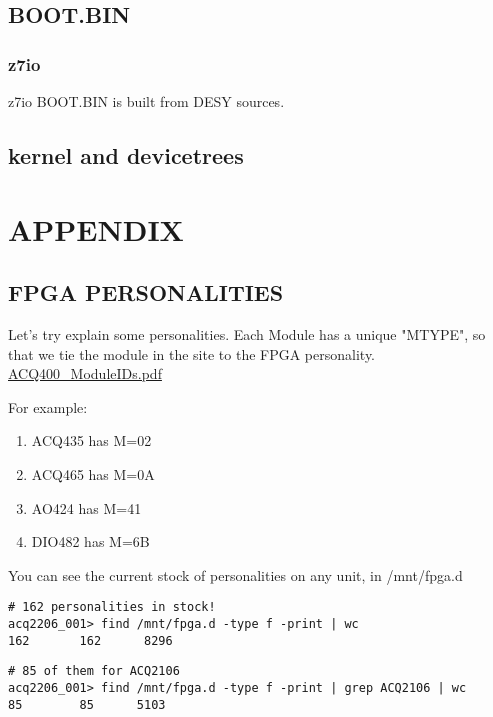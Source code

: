 \documentclass[]{article}
\begin{document}
\subsection{BOOT.BIN}

\subsubsection{z7io}
z7io BOOT.BIN is built from DESY sources.

\subsection{kernel and devicetrees}

\pagebreak

\section{APPENDIX}
	
	
\subsection{FPGA PERSONALITIES}\label{sec:fpga-personalities}

Let's try explain some personalities. Each Module has a unique "MTYPE", so that we tie the module in the site to the FPGA personality. 
\href{https://www.d-tacq.com/resources/Products_ACQ400_ModuleIDs.pdf}{ACQ400_ModuleIDs.pdf}

For example:
\begin{enumerate}
	\item ACQ435 has M=02
	\item ACQ465 has M=0A
	\item AO424  has M=41
	\item DIO482 has M=6B
\end{enumerate}

You can see the current stock of personalities on any  unit, in /mnt/fpga.d

\begin{lstlisting}[style=bashstyle,frame=single]
# 162 personalities in stock!
acq2206_001> find /mnt/fpga.d -type f -print | wc
162       162      8296
\end{lstlisting}

\begin{lstlisting}[style=bashstyle,frame=single]
# 85 of them for ACQ2106
acq2206_001> find /mnt/fpga.d -type f -print | grep ACQ2106 | wc
85        85      5103
\end{lstlisting}
\end{document}
